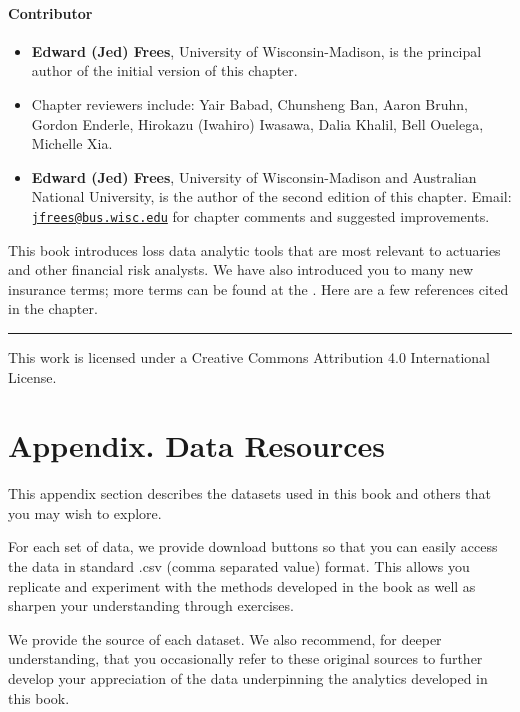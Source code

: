 \documentclass[
]{book}
\providecommand{\tightlist}{%
  \setlength{\itemsep}{0pt}\setlength{\parskip}{0pt}}
\begin{document}
\hypertarget{contributor}{%
\subsubsection*{Contributor}\label{contributor}}

\begin{itemize}
\tightlist
\item
  \textbf{Edward (Jed) Frees}, University of Wisconsin-Madison, is the principal author of the initial version of this chapter.
\item
  Chapter reviewers include: Yair Babad, Chunsheng Ban, Aaron Bruhn, Gordon Enderle, Hirokazu (Iwahiro) Iwasawa, Dalia Khalil, Bell Ouelega, Michelle Xia.
\item
  \textbf{Edward (Jed) Frees}, University of Wisconsin-Madison and Australian National University, is the author of the second edition of this chapter. Email: \href{mailto:jfrees@bus.wisc.edu}{\nolinkurl{jfrees@bus.wisc.edu}} for chapter comments and suggested improvements.
\end{itemize}

This book introduces loss data analytic tools that are most relevant to actuaries and other financial risk analysts. We have also introduced you to many new insurance terms; more terms can be found at the \citet{NAICGlossary}. Here are a few references cited in the chapter.

\begin{center}\rule{0.5\linewidth}{0.5pt}\end{center}

This work is licensed under a Creative Commons Attribution 4.0 International License.

\hypertarget{DataResources}{%
\chapter{Appendix. Data Resources}\label{DataResources}}

This appendix section describes the datasets used in this book and others that you may wish to explore.

For each set of data, we provide download buttons so that you can easily access the data in standard .csv (comma separated value) format. This allows you replicate and experiment with the methods developed in the book as well as sharpen your understanding through exercises.

We provide the source of each dataset. We also recommend, for deeper understanding, that you occasionally refer to these original sources to further develop your appreciation of the data underpinning the analytics developed in this book.
\end{document}
